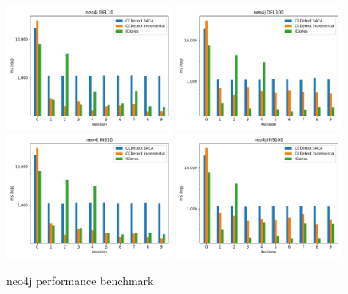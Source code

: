 \vfill

\newpage
\null
\vfill

\begin{figure}[H]
    \begin{center}
        \includegraphics[width=0.49\textwidth]{figures/performancegraphs/neo4j_DEL10.pdf}
        \includegraphics[width=0.49\textwidth]{figures/performancegraphs/neo4j_DEL100.pdf}
        \includegraphics[width=0.49\textwidth]{figures/performancegraphs/neo4j_INS10.pdf}
        \includegraphics[width=0.49\textwidth]{figures/performancegraphs/neo4j_INS100.pdf}
    \end{center}
    \caption{neo4j performance benchmark}
    \label{fig:neo4j}
\end{figure}


